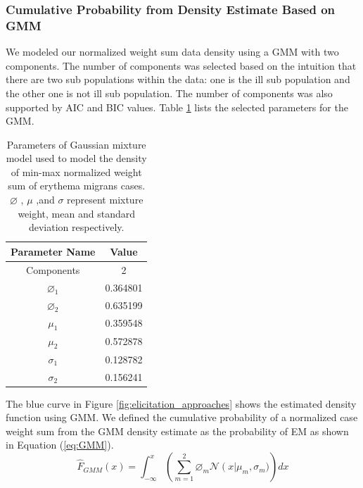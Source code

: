 \subsubsection{Cumulative Probability from Density Estimate Based on GMM}
\label{sec:GMM-approach}
We modeled our normalized weight sum data density using a GMM with two components. The number of components was selected based on the intuition that there are two sub populations within the data: one is the ill sub population and the other one is not ill sub population. The number of components was also supported by AIC and BIC values. Table \ref{tab:GMM_params} lists the selected parameters for the GMM. 
\begin{table}[htb!]
	\centering
	\caption[Parameters of Gaussian mixture model used to model the density of min-max normalized weight sum of erythema migrans cases]{Parameters of Gaussian mixture model used to model the density of min-max normalized weight sum of erythema migrans cases. $\varnothing$ , $\mu$ ,and $\sigma$ represent mixture weight, mean and standard deviation respectively.}
	\label{tab:GMM_params}
	\begin{tabular}{cc}
		\toprule
		\multicolumn{1}{c}{\textbf{Parameter Name}} & \textbf{Value} \\ \midrule
		Components                                  & 2              \\
		$\varnothing_{1} $                            & 0.364801       \\
		$\varnothing_{2} $                            & 0.635199       \\
		$\mu_{1}  $                                   & 0.359548       \\
		$\mu_{2} $                                    & 0.572878       \\
		$\sigma_{1} $                                 & 0.128782       \\
		$\sigma_{2}$                                  & 0.156241       \\ \bottomrule
	\end{tabular}
\end{table}
The blue curve in Figure \ref{fig:elicitation_approaches} shows the estimated density function using GMM. We defined the cumulative probability \cite{Carr2003} of a normalized case weight sum from the GMM density estimate as the probability of EM as shown in Equation (\ref{eq:GMM}).
\begin{equation}
	\label{eq:GMM}
	\hat{F}_{GMM}\left(x\right) =  \int_{-\infty }^{x}\left(\sum_{m = 1}^{2}\varnothing_{m}\mathcal{N}\left(x\right\vert  \mu_{m},\sigma_{m})\right)dx
\end{equation}

